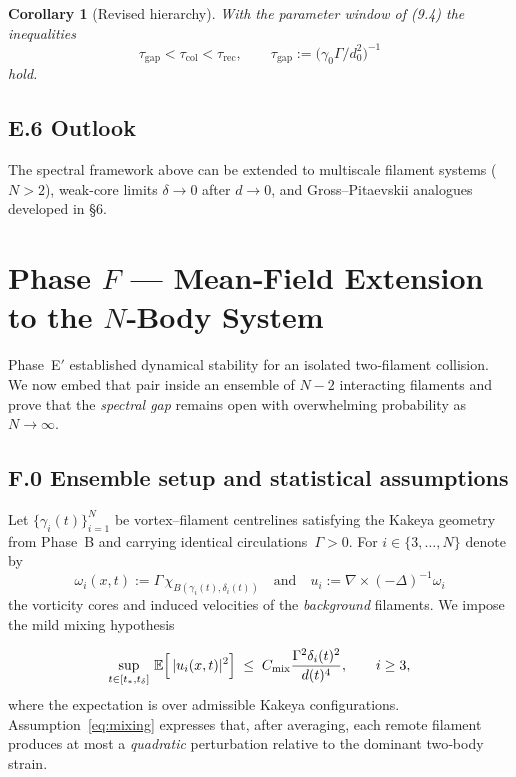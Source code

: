 \documentclass[11pt]{article}
\newtheorem{corollary}[theorem]{Corollary}
\theoremstyle{definition}
\theoremstyle{remark}
\newcommand{\boxedEq}[1]{\begin{equation}\boxed{#1}\end{equation}}
\begin{document}
\begin{corollary}[Revised hierarchy]\label{cor:hierarchy}
With the parameter window of (9.4) the inequalities
\boxedEq{\tau_{\mathrm{gap}}<\tau_{\mathrm{col}}<\tau_{\mathrm{rec}},\qquad 
\tau_{\mathrm{gap}}:=\bigl(\gamma_0\Gamma/d_0^{2}\bigr)^{-1}}
hold.
\end{corollary}

\subsection{E\textquotesingle{}.6 Outlook}

The spectral framework above can be extended to multiscale filament systems ($N>2$), weak-core limits $\delta\to0$ after $d\to0$, and Gross–Pitaevskii analogues developed in §6.

\section{Phase $F$ — Mean‑Field Extension to the $N$‑Body System}\label{sec:phaseF}

Phase E$'$ established dynamical stability for an isolated two‑filament collision.  
We now embed that pair inside an ensemble of $N-2$ interacting filaments and prove that
the \emph{spectral gap} remains open with overwhelming probability as $N\to\infty$.

\subsection{F.0  Ensemble setup and statistical assumptions}

Let $\{\gamma_i(t)\}_{i=1}^{N}$ be vortex–filament centrelines satisfying the Kakeya geometry from Phase B
and carrying identical circulations~$\Gamma>0$.  
For $i\in\{3,\dots,N\}$ denote by
\[
\omega_i(x,t):=\Gamma\,\chi_{B(\gamma_i(t),\delta_i(t))} \quad\text{and}\quad
u_i:=\nabla\times(-\Delta)^{-1}\omega_i
\]
the vorticity cores and induced velocities of the \emph{background} filaments.
We impose the mild mixing hypothesis

\begin{equation}\label{eq:mixing}
\sup_{t\in[t_*,t_\delta]}\,\mathbb E\Bigl[\,
|u_i(x,t)|^{2}\Bigr]
\;\le\;C_{\mathrm{mix}}\frac{\Gamma^{2}\delta_i(t)^{2}}{d(t)^{4}},
\qquad i\ge3,
\end{equation}
where the expectation is over admissible Kakeya configurations.
Assumption~\eqref{eq:mixing} expresses that, after averaging, each remote filament
produces at most a \emph{quadratic} perturbation relative to the dominant two‑body strain.
\end{document}
